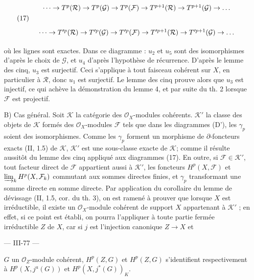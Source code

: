$$(17) \quad \begin{tikzcd} \dots \to T^p(\mathcal{R}) \to T^p(\mathcal{G}) \to T^p(\mathcal{F}) \to T^{p+1}(\mathcal{R}) \to T^{p+1}(\mathcal{G}) \to \dots \\ \dots \to T'^p(\mathcal{R}) \to T'^p(\mathcal{G}) \to T'^p(\mathcal{F}) \to T'^{p+1}(\mathcal{R}) \to T'^{p+1}(\mathcal{G}) \to \dots \end{tikzcd}$$

où les lignes sont exactes. Dans ce diagramme : $u_2$ et $u_5$ sont des isomorphismes d'après le choix de $\mathcal{G}$, et $u_4$ d'après l'hypothèse de récurrence. D'après le lemme des cinq, $u_3$ est surjectif. Ceci s'applique à tout faisceau cohérent sur $X$, en particulier à $\mathcal{R}$, donc $u_1$ est surjectif. Le lemme des cinq prouve alors que $u_3$ est injectif, ce qui achève la démonstration du lemme 4, et par suite du th. 2 lorsque $\mathcal{F}$ est projectif.

B) Cas général. Soit $\mathcal{K}$ la catégorie des $\mathcal{O}_X$-modules cohérents. $\mathcal{K}'$ la classe des objets de $\mathcal{K}$ formés des $\mathcal{O}_X$-modules $\mathcal{F}$ tels que dans les diagrammes (D'), les $\gamma_p$ soient des isomorphismes. Comme les $\gamma_p$ forment un morphisme de $\partial$-foncteurs exacts (II, 1.5) de $\mathcal{K}$, $\mathcal{K}'$ est une sous-classe exacte de $\mathcal{K}$; comme il résulte aussitôt du lemme des cinq appliqué aux diagrammes (17). En outre, si $\mathcal{F} \in \mathcal{K}'$, tout facteur direct de $\mathcal{F}$ appartient aussi à $\mathcal{K}'$, les foncteurs $H^p(X, \mathcal{F})$ et $\varinjlim_k H^p(X, \mathcal{F}_k)$ commutant aux sommes directes finies, et $\gamma_p$ transformant une somme directe en somme directe. Par application du corollaire du lemme de dévissage (II, 1.5, cor. du th. 3), on est ramené à prouver que lorsque $X$ est irréductible, il existe un $\mathcal{O}_X$-module cohérent de support $X$ appartenant à $\mathcal{K}'$ ; en effet, si ce point est établi, on pourra l'appliquer à toute partie fermée irréductible $Z$ de $X$, car si $j$ est l'injection canonique $Z \to X$ et

\newpage


— III-77 —

$G$ un $\mathcal{O}_Z$-module cohérent, $H^p(Z, G)$ et $H^p(Z, G)$ s'identifient respectivement à $H^p(X, j^a(G))$ et $H^p(X, j^*(G))_K$.

